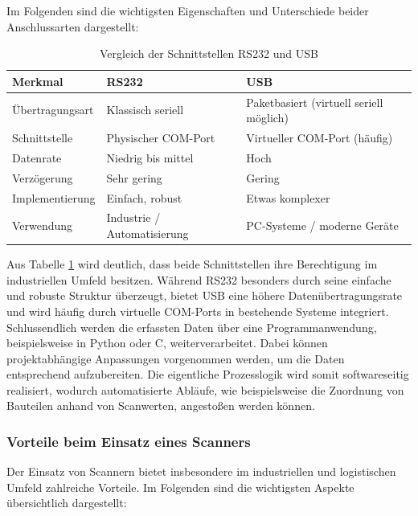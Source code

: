 Im Folgenden sind die wichtigsten Eigenschaften und Unterschiede beider Anschlussarten dargestellt:

\begin{table}[H]
	\centering
	\renewcommand{\arraystretch}{1.3}
	\begin{tabular}{|p{4cm}|p{4.5cm}|p{4.5cm}|}
		\hline
		\textbf{Merkmal} & \textbf{RS232} & \textbf{USB} \\ \hline
		Übertragungsart & Klassisch seriell & Paketbasiert (virtuell seriell möglich) \\ \hline
		Schnittstelle & Physischer COM-Port & Virtueller COM-Port (häufig) \\ \hline
		Datenrate & Niedrig bis mittel & Hoch \\ \hline
		Verzögerung & Sehr gering & Gering \\ \hline
		Implementierung & Einfach, robust & Etwas komplexer \\ \hline
		Verwendung & Industrie / Automatisierung & PC-Systeme / moderne Geräte \\ \hline
	\end{tabular}
	\caption{Vergleich der Schnittstellen RS232\cite{rs232_mikrocontroller} und USB\cite{usb_standard}}
	\label{tab:schnittstellen}
\end{table}

Aus Tabelle \ref{tab:schnittstellen} wird deutlich, dass beide Schnittstellen ihre Berechtigung im industriellen Umfeld besitzen. Während RS232 besonders durch seine einfache und robuste Struktur überzeugt\cite{rs232_mikrocontroller}, bietet USB eine höhere Datenübertragungsrate und wird häufig durch virtuelle COM-Ports in bestehende Systeme integriert\cite{usb_standard}.\\

Schlussendlich werden die erfassten Daten über eine Programmanwendung, beispielsweise in Python oder C, weiterverarbeitet. Dabei können projektabhängige Anpassungen vorgenommen werden, um die Daten entsprechend aufzubereiten. Die eigentliche Prozesslogik wird somit softwareseitig realisiert, wodurch automatisierte Abläufe, wie beispielsweise die Zuordnung von Bauteilen anhand von Scanwerten, angestoßen werden können.\clearpage
\subsubsection{Vorteile beim Einsatz eines Scanners}

Der Einsatz von Scannern bietet insbesondere im industriellen und logistischen Umfeld zahlreiche Vorteile. Im Folgenden sind die wichtigsten Aspekte übersichtlich dargestellt:

